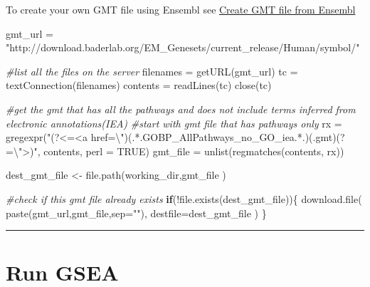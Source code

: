 \documentclass[
]{book}
\newenvironment{Shaded}{\begin{snugshade}}{\end{snugshade}}
\newcommand{\AttributeTok}[1]{\textcolor[rgb]{0.77,0.63,0.00}{#1}}
\newcommand{\CommentTok}[1]{\textcolor[rgb]{0.56,0.35,0.01}{\textit{#1}}}
\newcommand{\ConstantTok}[1]{\textcolor[rgb]{0.00,0.00,0.00}{#1}}
\newcommand{\ControlFlowTok}[1]{\textcolor[rgb]{0.13,0.29,0.53}{\textbf{#1}}}
\newcommand{\FunctionTok}[1]{\textcolor[rgb]{0.00,0.00,0.00}{#1}}
\newcommand{\NormalTok}[1]{#1}
\newcommand{\OtherTok}[1]{\textcolor[rgb]{0.56,0.35,0.01}{#1}}
\newcommand{\SpecialCharTok}[1]{\textcolor[rgb]{0.00,0.00,0.00}{#1}}
\newcommand{\StringTok}[1]{\textcolor[rgb]{0.31,0.60,0.02}{#1}}
\begin{document}
To create your own GMT file using Ensembl see \protect\hyperlink{create-gmt-file-from-ensembl}{Create GMT file from Ensembl}

\begin{Shaded}
\begin{Highlighting}[]
\NormalTok{gmt\_url }\OtherTok{=} \StringTok{"http://download.baderlab.org/EM\_Genesets/current\_release/Human/symbol/"}

\CommentTok{\#list all the files on the server}
\NormalTok{filenames }\OtherTok{=} \FunctionTok{getURL}\NormalTok{(gmt\_url)}
\NormalTok{tc }\OtherTok{=} \FunctionTok{textConnection}\NormalTok{(filenames)}
\NormalTok{contents }\OtherTok{=} \FunctionTok{readLines}\NormalTok{(tc)}
\FunctionTok{close}\NormalTok{(tc)}

\CommentTok{\#get the gmt that has all the pathways and does not include terms inferred from electronic annotations(IEA)}
\CommentTok{\#start with gmt file that has pathways only}
\NormalTok{rx }\OtherTok{=} \FunctionTok{gregexpr}\NormalTok{(}\StringTok{"(?\textless{}=\textless{}a href=}\SpecialCharTok{\textbackslash{}"}\StringTok{)(.*.GOBP\_AllPathways\_no\_GO\_iea.*.)(.gmt)(?=}\SpecialCharTok{\textbackslash{}"}\StringTok{\textgreater{})"}\NormalTok{,}
\NormalTok{  contents, }\AttributeTok{perl =} \ConstantTok{TRUE}\NormalTok{)}
\NormalTok{gmt\_file }\OtherTok{=} \FunctionTok{unlist}\NormalTok{(}\FunctionTok{regmatches}\NormalTok{(contents, rx))}

\NormalTok{dest\_gmt\_file }\OtherTok{\textless{}{-}} \FunctionTok{file.path}\NormalTok{(working\_dir,gmt\_file )}

\CommentTok{\#check if this gmt file already exists}
\ControlFlowTok{if}\NormalTok{(}\SpecialCharTok{!}\FunctionTok{file.exists}\NormalTok{(dest\_gmt\_file))\{}
  \FunctionTok{download.file}\NormalTok{(}
    \FunctionTok{paste}\NormalTok{(gmt\_url,gmt\_file,}\AttributeTok{sep=}\StringTok{""}\NormalTok{),}
    \AttributeTok{destfile=}\NormalTok{dest\_gmt\_file}
\NormalTok{  )}
\NormalTok{\}}
\end{Highlighting}
\end{Shaded}

\begin{center}\rule{0.5\linewidth}{0.5pt}\end{center}

\hypertarget{run-gsea}{%
\section{Run GSEA}\label{run-gsea}}
\end{document}
